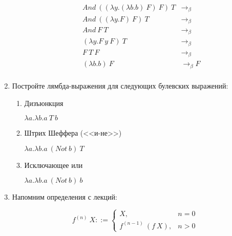 \begin{enumerate}
\begin{enumerate}
\begin{solution}
\begin{align*}
                            And\ ((\lambda y.(\lambda b.b)\ F)\ F)\ T & \to_\beta   \\
                            And\ ((\lambda y.F)\ F)\ T                & \to_\beta   \\
                            And\ F\ T                                 & \to_\beta   \\
                            (\lambda y.F\ y\ F)\ T                    & \to_\beta   \\
                            F\ T\ F                                   & \to_\beta   \\
                            (\lambda b.b)\ F                          & \to_\beta F \\
                        \end{align*}
                    \end{solution}
          \end{enumerate}

    \item Постройте лямбда-выражения для следующих булевских выражений:
          \begin{enumerate}
              \item Дизъюнкция
                    \begin{solution}
                        \(\lambda a.\lambda b.a\ T\ b\)
                    \end{solution}
              \item Штрих Шеффера (<<и-не>>)
                    \begin{solution}
                        \(\lambda a.\lambda b.a\ (Not\ b)\ T\)
                    \end{solution}
              \item Исключающее или
                    \begin{solution}
                        \(\lambda a.\lambda b.a\ (Not\ b)\ b\)
                    \end{solution}
          \end{enumerate}

    \item Напомним определения с лекций:

          $$f^{(n)}\ X ::= \left\{\begin{array}{ll} X,            & n=0 \\
             f^{(n-1)}\ (f\ X), & n>0\end{array}\right.$$


\end{enumerate}
